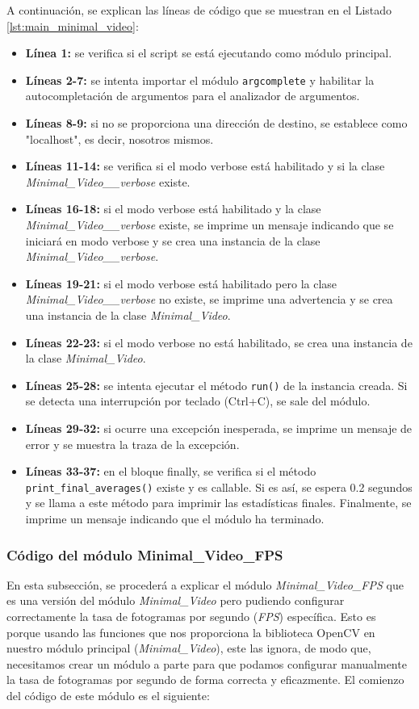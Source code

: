 A continuación, se explican las líneas de código que se muestran en el Listado \ref{lst:main_minimal_video}:
\begin{itemize}
    \item \textbf{Línea 1:} se verifica si el script se está ejecutando como módulo principal.
    \item \textbf{Líneas 2-7:} se intenta importar el módulo \texttt{argcomplete} y habilitar la autocompletación de argumentos para el analizador de argumentos.
    \item \textbf{Líneas 8-9:} si no se proporciona una dirección de destino, se establece como "localhost", es decir, nosotros mismos.
    \item \textbf{Líneas 11-14:} se verifica si el modo verbose está habilitado y si la clase \textit{Minimal\_Video\_\_verbose} existe.
    \item \textbf{Líneas 16-18:} si el modo verbose está habilitado y la clase \textit{Minimal\_Video\_\_verbose} existe, se imprime un mensaje indicando que se iniciará en modo verbose y se crea una instancia de la clase \textit{Minimal\_Video\_\_verbose}.
    \item \textbf{Líneas 19-21:} si el modo verbose está habilitado pero la clase \textit{Minimal\_Video\_\_verbose} no existe, se imprime una advertencia y se crea una instancia de la clase \textit{Minimal\_Video}.
    \item \textbf{Líneas 22-23:} si el modo verbose no está habilitado, se crea una instancia de la clase \textit{Minimal\_Video}.
    \item \textbf{Líneas 25-28:} se intenta ejecutar el método \texttt{run()} de la instancia creada. Si se detecta una interrupción por teclado (Ctrl+C), se sale del módulo.
    \item \textbf{Líneas 29-32:} si ocurre una excepción inesperada, se imprime un mensaje de error y se muestra la traza de la excepción.
    \item \textbf{Líneas 33-37:} en el bloque finally, se verifica si el método \texttt{print\_final\_averages()} existe y es callable. Si es así, se espera 0.2 segundos y se llama a este método para imprimir las estadísticas finales. Finalmente, se imprime un mensaje indicando que el módulo ha terminado.
\end{itemize}
\vspace{\baselineskip}

\newpage

\subsubsection{Código del módulo Minimal\_Video\_FPS}
En esta subsección, se procederá a explicar el módulo \textit{Minimal\_Video\_FPS} que es una versión del módulo \textit{Minimal\_Video} pero pudiendo configurar correctamente la tasa de fotogramas por segundo (\textit{FPS}) específica. Esto es porque usando las funciones que nos proporciona la biblioteca OpenCV en nuestro módulo principal (\textit{Minimal\_Video}), este las ignora, de modo que, necesitamos crear un módulo a parte para que podamos configurar manualmente la tasa de fotogramas por segundo de forma correcta y eficazmente. El comienzo del código de este módulo es el siguiente:

